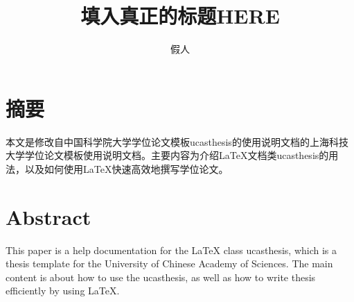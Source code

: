 \confidential{}%
\title{填入真正的标题HERE}%
\author{假人}%
\advisorsec{}%
\englishdate{\quad / \quad /\quad}%

\chapter*{摘\quad 要}%
\setcounter{page}{1}%

本文是修改自中国科学院大学学位论文模板ucasthesis的使用说明文档的上海科技大学学位论文模板使用说明文档。主要内容为介绍\LaTeX{}文档类ucasthesis的用法，以及如何使用\LaTeX{}快速高效地撰写学位论文。

\chapter*{Abstract}%

This paper is a help documentation for the \LaTeX{} class ucasthesis, which is  a thesis template for the University of Chinese Academy of Sciences. The main content is about how to use the ucasthesis, as well as how to write thesis efficiently by using \LaTeX{}.

